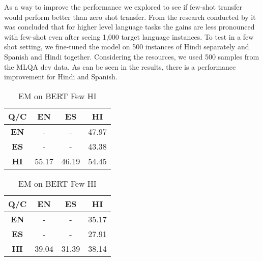 \documentclass[12pt]{article}   %
\begin{document}
As a way to improve the performance we explored to see if few-shot transfer would perform better than zero shot transfer. From the research conducted by \cite{lauscher-etal-2020-zero} it was concluded that for higher level language tasks the gains are less pronounced with few-shot even after seeing 1,000 target language instances. To test in a few shot setting, we fine-tuned the model on 500 instances of Hindi separately and Spanish and Hindi together. Considering the resources, we used 500 samples from the MLQA dev data. As can be seen in the results, there is a performance improvement for Hindi and Spanish.
 \begin{table}[H]
        \begin{minipage}{0.5\textwidth}
            \centering
		\begin{tabular}{|c|c|c|c|}
			\hline
 			\textbf{Q/C} &  \textbf{EN} &  \textbf{ES} &  \textbf{HI} \\
			\hline
			 \textbf{EN} & - & - & 47.97 \\
			\hline
			\textbf{ES} & - & - & 43.38 \\
			\hline
			\textbf{HI} & 55.17 & 46.19 & 54.45 \\
			\hline
		\end{tabular}
		\caption{F1 on BERT Few HI}
	\end{minipage}%
        \hfill
	\begin{minipage}{0.5\textwidth}
         	\centering
			\begin{tabular}{|c|c|c|c|}
				\hline
				 \textbf{Q/C} &  \textbf{EN} &  \textbf{ES} &  \textbf{HI} \\
				\hline
				\textbf{EN} & -& - & 35.17 \\
				 \hline
				\textbf{ES} & - & - & 27.91 \\
				\hline
				 \textbf{HI} & 39.04& 31.39 & 38.14\\
				 \hline
			\end{tabular}
			\caption{EM on BERT Few HI}
	\end{minipage}%
\end{table}
\end{document}
